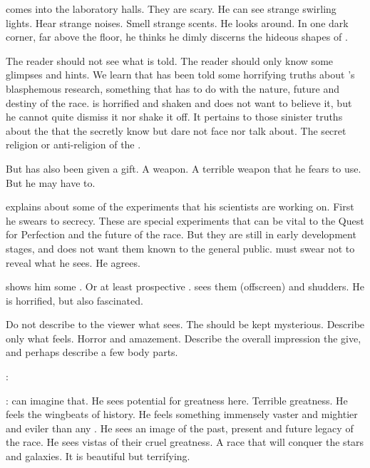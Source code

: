 \Teshrial comes into the laboratory halls. 
They are scary.
He can see strange swirling lights.
Hear strange noises.
Smell strange scents. 
He looks around. 
In one dark corner, far above the floor, he thinks he dimly discerns the hideous shapes of \SitraAchra \screamers. 

The reader should not see what \Teshrial is told.
The reader should only know some glimpses and hints. 
We learn that \Teshrial has been told some horrifying truths about \Azraid's blasphemous research, something that has to do with the nature, future and destiny of the \resphan race. 
\Teshrial is horrified and shaken and does not want to believe it, but he cannot quite dismiss it nor shake it off.
It pertains to those sinister truths about the \SitraAchras that the \resphain secretly know but dare not face nor talk about. 
The secret religion or anti-religion of the \resphain.

But \Teshrial has also been given a gift. 
A weapon. 
A terrible weapon that he fears to use. 
But he may have to.



\begin{comment}
  \subsection{Azraid tells about the weapon}
\end{comment}

\Azraid explains about some of the experiments that his scientists are working on. 
First he swears \Teshrial to secrecy.
These are special experiments that can be vital to the Quest for Perfection and the future of the \resphan race.
But they are still in early development stages, and \Azraid does not want them known to the general public. 
\Teshrial must swear not to reveal what he sees. 
He agrees. 

\Azraid shows him some \neoresphain. 
Or at least prospective \neoresphain. 
\Teshrial sees them (offscreen) and shudders. 
He is horrified, but also fascinated. 

Do not describe to the viewer what \Teshrial sees. 
The \neoresphain should be kept mysterious.
Describe only what \Teshrial feels. 
Horror and amazement.
Describe the overall impression the \neoresphain give, and perhaps describe a few body parts. 

\Azraid:

\Teshrial:
\Teshrial can imagine that. 
He sees potential for greatness here.
Terrible greatness. 
He feels the wingbeats of history.
He feels something immensely vaster and mightier and eviler than any \resphan.
He sees an image of the past, present and future legacy of the \resphan race.
He sees vistas of their cruel greatness.
A race that will conquer the stars and galaxies. 
It is beautiful but terrifying.

